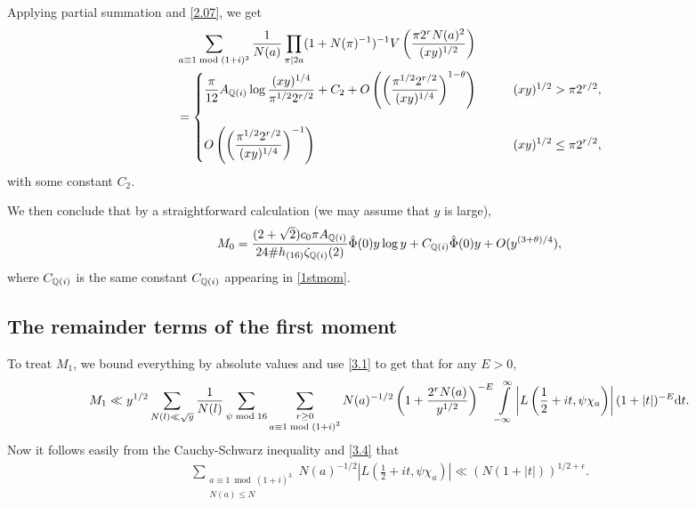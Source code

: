 \documentclass[twoside,leqno,10pt, A4]{amsart}
\begin{document}
Applying partial summation and \eqref{2.07}, we get
\begin{align*}
  & \sum_{a \equiv 1 \bmod {(1+i)^3}} \frac{1}{N(a)}\prod_{\pi |
  2a}(1+N(\pi)^{-1})^{-1}V \left( \frac{\pi 2^rN(a)^2}{(xy)^{1/2}} \right)\\
 & =\begin{cases}
  \displaystyle \frac {\pi}{12}A_{\mathbb Q(i)}\log \frac {(xy)^{1/4}}{\pi^{1/2} 2^{r/2}}+C_2+O\left( \left( \frac {\pi^{1/2} 2^{r/2}}{(xy)^{1/4}} \right)^{1-\theta} \right) \qquad & (xy)^{1/2} > \pi 2^{r/2} , \\ \\
\displaystyle     O\left( \left( \frac {\pi^{1/2} 2^{r/2}}{(xy)^{1/4}} \right)^{-1} \right)  \qquad & \displaystyle (xy)^{1/2} \leq \pi 2^{r/2}  ,
    \end{cases}
\end{align*}
   with some constant $C_2$. \newline

   We then conclude that by a straightforward calculation (we may assume that $y$ is large),
\begin{align} \label{M0formula}
  M_0 =\frac {(2+\sqrt{2})c_0\pi A_{\mathbb Q(i)}}{24 \#h_{(16)}\zeta_{\mathbb Q(i)}(2)}\hat{\Phi}(0) y\log y +C_{\mathbb Q(i)} \hat{\Phi}(0)y+O(y^{(3+\theta)/4}),
\end{align}
   where $C_{\mathbb Q(i)}$ is the same constant $C_{\mathbb Q(i)}$ appearing in \eqref{1stmom}.

\subsection{The remainder terms of the first moment}

   To treat $M_1$, we bound everything by absolute values and use \eqref{3.1} to get that for any $E>0$,
\begin{align}
\label{3.2}
   M_1 \ll y^{1/2} \sum_{N(l) \ll \sqrt{y}}\frac {1}{N(l)} \sum_{\psi \bmod {16}} \sum_{\substack{r \geq 0 \\ a \equiv 1 \bmod {(1+i)^3}}} N(a)^{-1/2} \left( 1+\frac{2^rN(a)}{y^{1/2}} \right)^{-E} \int\limits^{\infty}_{-\infty} \left| L\left(\frac 12+it, \psi\chi_a \right) \right| (1+|t|)^{-E} \mathrm{d} t.
\end{align}
  Now it follows easily from the Cauchy-Schwarz inequality and \eqref{3.4} that
\begin{align*}
    \sum_{\substack{a \equiv 1 \bmod {(1+i)^3} \\ N(a) \leq N}}  N(a)^{-1/2} \left| L\left( \frac 12+it, \psi\chi_a \right) \right| \ll (N(1+|t|))^{1/2+\epsilon}.
\end{align*}
\end{document}
